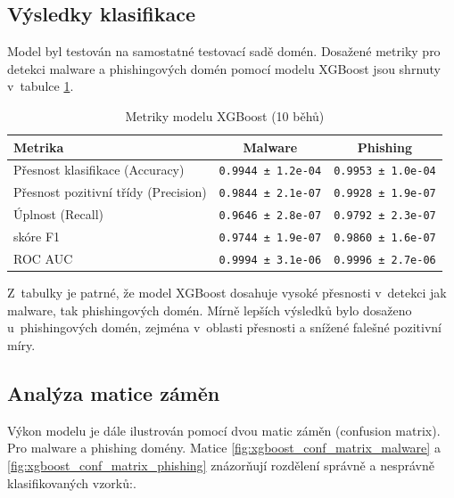 \subsection{Výsledky klasifikace}

Model byl testován na samostatné testovací sadě domén. Dosažené metriky pro detekci malware a phishingových domén pomocí modelu XGBoost jsou shrnuty v~tabulce \ref{tab:xgboost_malware_phishing_results}.

\begin{table}[h!]
\centering
\begin{tabular}{|l|c|c|}
\hline
\textbf{Metrika} & \textbf{Malware} & \textbf{Phishing} \\
\hline
Přesnost klasifikace (Accuracy) & \texttt{0.9944 ± 1.2e-04} & \texttt{0.9953 ± 1.0e-04} \\
Přesnost pozitivní třídy (Precision) & \texttt{0.9844 ± 2.1e-07} & \texttt{0.9928 ± 1.9e-07} \\
Úplnost (Recall) & \texttt{0.9646 ± 2.8e-07} & \texttt{0.9792 ± 2.3e-07} \\
skóre F1 & \texttt{0.9744 ± 1.9e-07} & \texttt{0.9860 ± 1.6e-07} \\
ROC AUC & \texttt{0.9994 ± 3.1e-06} & \texttt{0.9996 ± 2.7e-06} \\
\hline
\end{tabular}
\caption{Metriky modelu XGBoost (10 běhů)}
\label{tab:xgboost_malware_phishing_results}
\end{table}




Z~tabulky je patrné, že model XGBoost dosahuje vysoké přesnosti v~detekci jak malware, tak phishingových domén. Mírně lepších výsledků bylo dosaženo u~phishingových domén, zejména v~oblasti přesnosti a snížené falešné pozitivní míry.



\subsection{Analýza matice záměn}

Výkon modelu je dále ilustrován pomocí dvou matic záměn (confusion matrix). Pro malware a phishing domény. Matice \ref{fig:xgboost_conf_matrix_malware} a \ref{fig:xgboost_conf_matrix_phishing} znázorňují rozdělení správně a nesprávně klasifikovaných vzorků:.

